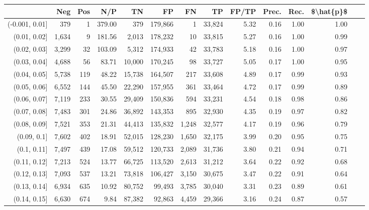 \begin{tabular}{rrrrrrrrrrrrrr}
\toprule
{} &    Neg &  Pos &     N/P &       TN &       FP &      FN &      TP & FP/TP & Prec. &  Rec. & \$\textbackslash hat\{p\}\$ \\
\midrule
(-0.001, 0.01] &    379 &    1 &  379.00 &      379 &  179,866 &       1 &  33,824 &  5.32 &  0.16 &  1.00 &      1.00 \\
(0.01, 0.02]   &  1,634 &    9 &  181.56 &    2,013 &  178,232 &      10 &  33,815 &  5.27 &  0.16 &  1.00 &      0.99 \\
(0.02, 0.03]   &  3,299 &   32 &  103.09 &    5,312 &  174,933 &      42 &  33,783 &  5.18 &  0.16 &  1.00 &      0.97 \\
(0.03, 0.04]   &  4,688 &   56 &   83.71 &   10,000 &  170,245 &      98 &  33,727 &  5.05 &  0.17 &  1.00 &      0.95 \\
(0.04, 0.05]   &  5,738 &  119 &   48.22 &   15,738 &  164,507 &     217 &  33,608 &  4.89 &  0.17 &  0.99 &      0.93 \\
(0.05, 0.06]   &  6,552 &  144 &   45.50 &   22,290 &  157,955 &     361 &  33,464 &  4.72 &  0.17 &  0.99 &      0.89 \\
(0.06, 0.07]   &  7,119 &  233 &   30.55 &   29,409 &  150,836 &     594 &  33,231 &  4.54 &  0.18 &  0.98 &      0.86 \\
(0.07, 0.08]   &  7,483 &  301 &   24.86 &   36,892 &  143,353 &     895 &  32,930 &  4.35 &  0.19 &  0.97 &      0.82 \\
(0.08, 0.09]   &  7,521 &  353 &   21.31 &   44,413 &  135,832 &   1,248 &  32,577 &  4.17 &  0.19 &  0.96 &      0.79 \\
(0.09, 0.1]    &  7,602 &  402 &   18.91 &   52,015 &  128,230 &   1,650 &  32,175 &  3.99 &  0.20 &  0.95 &      0.75 \\
(0.1, 0.11]    &  7,497 &  439 &   17.08 &   59,512 &  120,733 &   2,089 &  31,736 &  3.80 &  0.21 &  0.94 &      0.71 \\
(0.11, 0.12]   &  7,213 &  524 &   13.77 &   66,725 &  113,520 &   2,613 &  31,212 &  3.64 &  0.22 &  0.92 &      0.68 \\
(0.12, 0.13]   &  7,093 &  537 &   13.21 &   73,818 &  106,427 &   3,150 &  30,675 &  3.47 &  0.22 &  0.91 &      0.64 \\
(0.13, 0.14]   &  6,934 &  635 &   10.92 &   80,752 &   99,493 &   3,785 &  30,040 &  3.31 &  0.23 &  0.89 &      0.61 \\
(0.14, 0.15]   &  6,630 &  674 &    9.84 &   87,382 &   92,863 &   4,459 &  29,366 &  3.16 &  0.24 &  0.87 &      0.57 \\

\end{tabular}
